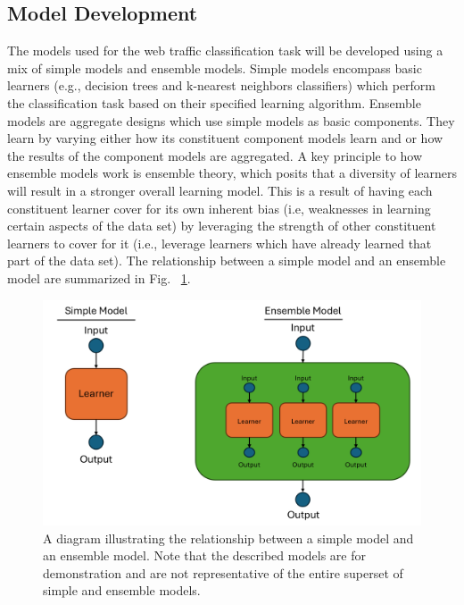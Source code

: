 \documentclass[10pt,sigconf,letterpaper,nonacm]{acmart}
\begin{document}
\subsection{Model Development}

The models used for the web traffic classification task will be developed using a mix of simple models and ensemble models.
Simple models encompass basic learners (e.g., decision trees and k-nearest neighbors classifiers) which perform the classification task based on their specified learning algorithm.
Ensemble models are aggregate designs which use simple models as basic components.
They learn by varying either how its constituent component models learn and or how the results of the component models are aggregated.
A key principle to how ensemble models work is ensemble theory, which posits that a diversity of learners will result in a stronger overall learning model.
This is a result of having each constituent learner cover for its own inherent bias (i.e, weaknesses in learning certain aspects of the data set) by leveraging the strength of other constituent learners to cover for it (i.e., leverage learners which have already learned that part of the data set).
The relationship between a simple model and an ensemble model are summarized in Fig. ~\ref{fig:models}.

\begin{figure}[h]
  \centering
  \includegraphics[width=\linewidth]{img/models.png}
  \caption{A diagram illustrating the relationship between a simple model and an ensemble model. Note that the described models are for demonstration and are not representative of the entire superset of simple and ensemble models.}
  \label{fig:models}
\end{figure}
\end{document}
